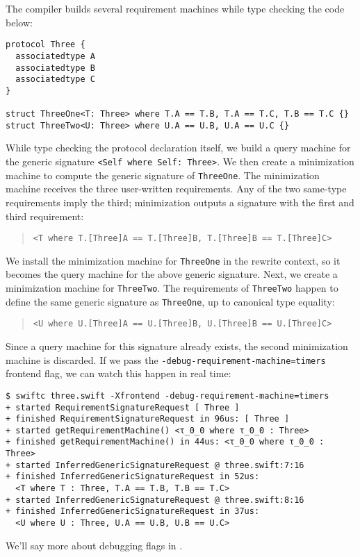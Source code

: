 \documentclass[../generics]{subfiles}
\begin{document}
\begin{example}
The compiler builds several requirement machines while type checking the code below:
\begin{Verbatim}
protocol Three {
  associatedtype A
  associatedtype B
  associatedtype C
}

struct ThreeOne<T: Three> where T.A == T.B, T.A == T.C, T.B == T.C {}
struct ThreeTwo<U: Three> where U.A == U.B, U.A == U.C {}
\end{Verbatim}

While type checking the protocol declaration itself, we build a query machine for the generic signature \verb|<Self where Self: Three>|. We then create a minimization machine to compute the generic signature of \texttt{ThreeOne}. The minimization machine receives the three user-written requirements. Any of the two same-type requirements imply the third; minimization outputs a signature with the first and third requirement:
\begin{quote}
\begin{verbatim}
<T where T.[Three]A == T.[Three]B, T.[Three]B == T.[Three]C>
\end{verbatim}
\end{quote}
We install the minimization machine for \texttt{ThreeOne} in the rewrite context, so it becomes the query machine for the above generic signature. Next, we create a minimization machine for \texttt{ThreeTwo}. The requirements of \texttt{ThreeTwo} happen to define the same generic signature as \texttt{ThreeOne}, up to canonical type equality:
\begin{quote}
\begin{verbatim}
<U where U.[Three]A == U.[Three]B, U.[Three]B == U.[Three]C>
\end{verbatim}
\end{quote}
Since a query machine for this signature already exists, the second minimization machine is discarded. If we pass the \texttt{-debug-requirement-machine=timers} frontend flag, we can watch this happen in real time:
\begin{Verbatim}[fontsize=\footnotesize,numbers=none]
$ swiftc three.swift -Xfrontend -debug-requirement-machine=timers
+ started RequirementSignatureRequest [ Three ]
+ finished RequirementSignatureRequest in 96us: [ Three ]
+ started getRequirementMachine() <τ_0_0 where τ_0_0 : Three>
+ finished getRequirementMachine() in 44us: <τ_0_0 where τ_0_0 : Three>
+ started InferredGenericSignatureRequest @ three.swift:7:16
+ finished InferredGenericSignatureRequest in 52us:
  <T where T : Three, T.A == T.B, T.B == T.C>
+ started InferredGenericSignatureRequest @ three.swift:8:16
+ finished InferredGenericSignatureRequest in 37us:
  <U where U : Three, U.A == U.B, U.B == U.C>
\end{Verbatim}
\end{example}
We'll say more about debugging flags in .
\end{document}
